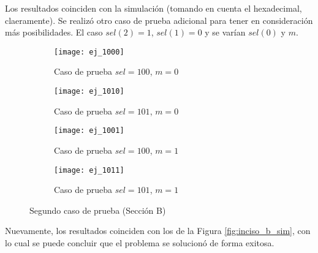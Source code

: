 \documentclass[../procedimientos.tex]{subfiles}
\begin{document}
Los resultados coinciden con la simulación (tomando en cuenta el hexadecimal, 
claeramente). Se realizó otro caso de prueba adicional para tener en 
consideración más posibilidades. El caso $sel(2) = 1$, $sel(1) = 0$ y se 
varían $sel(0)$ y $m$.
\begin{figure}[H]
  \centering
  \begin{subfigure}[b]{0.45\textwidth}
    \centering
    \texttt{[image: ej\_1000]}
    \caption{Caso de prueba $sel = 100$, $m = 0$}
    \label{fig:b_tarj_5}
  \end{subfigure}
  \begin{subfigure}[b]{0.45\textwidth}
    \centering
    \texttt{[image: ej\_1010]}
    \caption{Caso de prueba $sel = 101$, $m = 0$}
    \label{fig:b_tarj_6}
  \end{subfigure}
  \begin{subfigure}[b]{0.45\textwidth}
    \centering
    \texttt{[image: ej\_1001]}
    \caption{Caso de prueba $sel = 100$, $m = 1$}
    \label{fig:b_tarj_7}
  \end{subfigure}
  \begin{subfigure}[b]{0.45\textwidth}
    \centering
    \texttt{[image: ej\_1011]}
    \caption{Caso de prueba $sel = 101$, $m = 1$}
    \label{fig:b_tarj_8}
  \end{subfigure}
  \caption{Segundo caso de prueba (Sección B)}
\end{figure}

Nuevamente, los resultados coinciden con los de la Figura 
\ref{fig:inciso_b_sim}, con lo cual se puede concluir que el problema se 
solucionó de forma exitosa.
\end{document}

